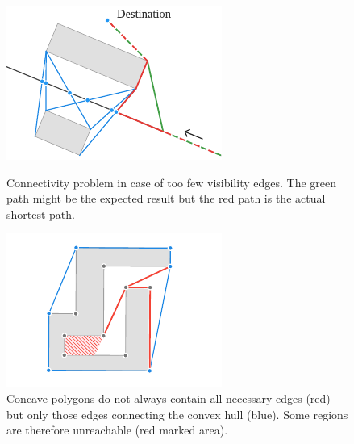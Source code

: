 		\begin{figure}
			\vspace{-1.5\baselineskip}
			\includegraphics[width=\linewidth]{images/qgis-future-work-connectivity-problem}
			\caption{Connectivity problem in case of too few visibility edges. The green path might be the expected result but the red path is the actual shortest path.}
			\label{fig:connectivity-problem}
			\vspace{\baselineskip}
			\includegraphics[width=\linewidth]{images/qgis-future-work-convex-hull-problem}
			\caption{Concave polygons do not always contain all necessary edges (red) but only those edges connecting the convex hull (blue). Some regions are therefore unreachable (red marked area).}
			\label{fig:convex-hull-problem}
		\end{figure}
				
